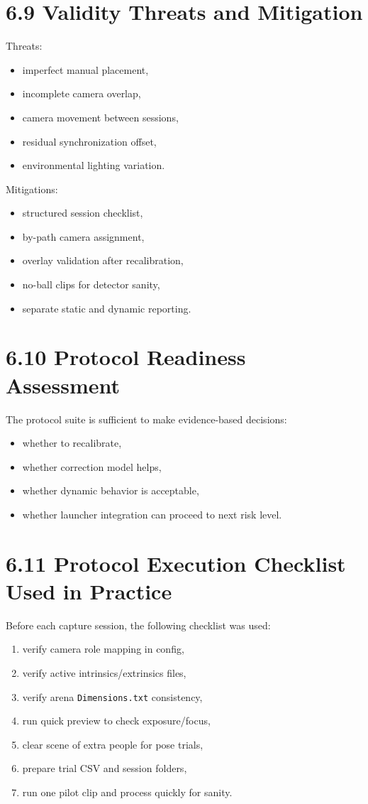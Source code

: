 \section{6.9 Validity Threats and Mitigation}
Threats:
\begin{itemize}
  \item imperfect manual placement,
  \item incomplete camera overlap,
  \item camera movement between sessions,
  \item residual synchronization offset,
  \item environmental lighting variation.
\end{itemize}

Mitigations:
\begin{itemize}
  \item structured session checklist,
  \item by-path camera assignment,
  \item overlay validation after recalibration,
  \item no-ball clips for detector sanity,
  \item separate static and dynamic reporting.
\end{itemize}

\section{6.10 Protocol Readiness Assessment}
The protocol suite is sufficient to make evidence-based decisions:
\begin{itemize}
  \item whether to recalibrate,
  \item whether correction model helps,
  \item whether dynamic behavior is acceptable,
  \item whether launcher integration can proceed to next risk level.
\end{itemize}


\section{6.11 Protocol Execution Checklist Used in Practice}
Before each capture session, the following checklist was used:
\begin{enumerate}
  \item verify camera role mapping in config,
  \item verify active intrinsics/extrinsics files,
  \item verify arena \texttt{Dimensions.txt} consistency,
  \item run quick preview to check exposure/focus,
  \item clear scene of extra people for pose trials,
  \item prepare trial CSV and session folders,
  \item run one pilot clip and process quickly for sanity.
\end{enumerate}

